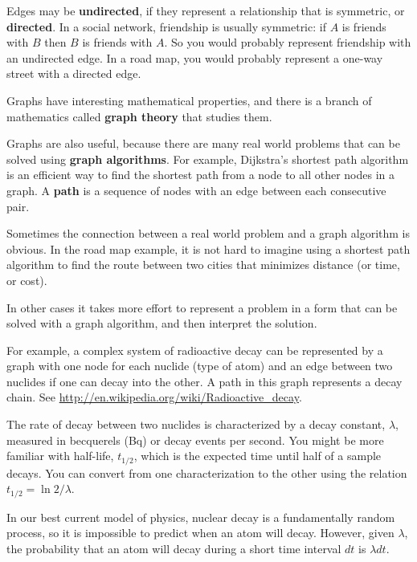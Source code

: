 \documentclass[10pt]{book}
\begin{document}
Edges may be {\bf undirected}, if they represent a relationship
that is symmetric, or {\bf directed}.  In a social network,
friendship is usually symmetric: if $A$ is friends with $B$ then
$B$ is friends with $A$.  So you would probably represent friendship
with an undirected edge.  In a road map, you would probably represent
a one-way street with a directed edge.

Graphs have interesting mathematical properties, and
there is a branch of mathematics called {\bf graph theory}
that studies them.

Graphs are also useful, because there are many real world
problems that can be solved using {\bf graph algorithms}.
For example, Dijkstra's shortest path algorithm is an efficient
way to find the shortest path from a node to all
other nodes in a graph.  A {\bf path} is a sequence of nodes
with an edge between each consecutive pair.

Sometimes the connection between a real world problem and
a graph algorithm is obvious.  In the road map example, it is
not hard to imagine using a shortest path algorithm to find
the route between two cities that minimizes distance (or time,
or cost).

In other cases it takes more effort to represent a problem in a form
that can be solved with a graph algorithm, and then interpret the
solution.

For example, a complex system of radioactive decay
can be represented by a
graph with one node for each nuclide (type of atom) and an edge
between two nuclides if one can decay into the other.  A path in this
graph represents a decay chain.
See \url{http://en.wikipedia.org/wiki/Radioactive_decay}.

The rate of decay between two nuclides is characterized by a decay
constant, $\lambda$, measured in becquerels (Bq) or decay events per
second.  You might be more familiar with half-life, $t_{1/2}$, which
is the expected time until half of a sample decays.  You can convert
from one characterization to the other using the relation $t_{1/2} =
\ln 2 / \lambda$.

In our best current model of physics, nuclear decay is a fundamentally
random process, so it is impossible to predict when an atom will
decay.  However, given $\lambda$, the probability that an atom will
decay during a short time interval $dt$ is $\lambda dt$.
\end{document}
